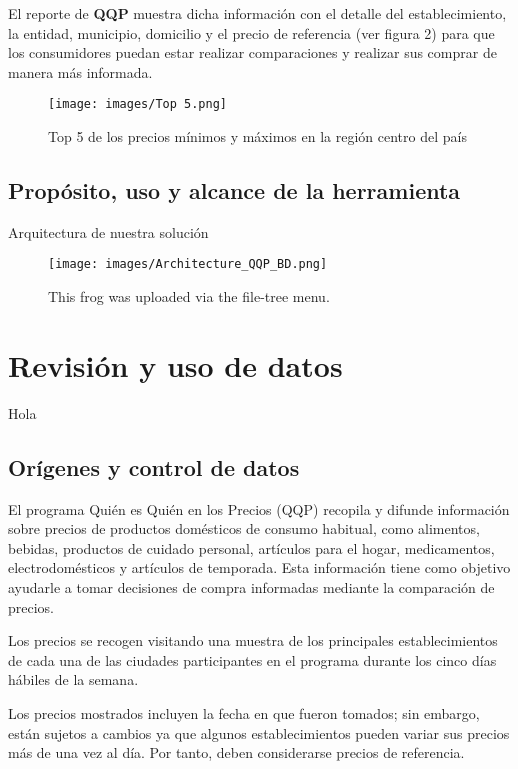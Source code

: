 \documentclass{article}
\begin{document}
\newpage 
El reporte de \textbf{QQP} muestra dicha información con el detalle del establecimiento, la entidad, municipio, domicilio y el precio de referencia (ver figura 2) para que los consumidores puedan estar realizar comparaciones y realizar sus comprar de manera más informada.

\begin{figure}[h]
\centering
\texttt{[image: images/Top 5.png]}
\caption{\label{fig:Canasta}Top 5 de los precios mínimos y máximos en la región centro del país}
\end{figure}

\subsection{Propósito, uso y alcance de la herramienta}

Arquitectura de nuestra solución
\begin{figure}[h]
\centering
\texttt{[image: images/Architecture\_QQP\_BD.png]}
\caption{\label{fig:Architecture}This frog was uploaded via the file-tree menu.}
\end{figure}

\section{Revisión y uso de datos}

Hola

\subsection{Orígenes y control de datos}

El programa Quién es Quién en los Precios (QQP) recopila y difunde información sobre precios de productos domésticos de consumo habitual, como alimentos, bebidas, productos de cuidado personal, artículos para el hogar, medicamentos, electrodomésticos y artículos de temporada. Esta información tiene como objetivo ayudarle a tomar decisiones de compra informadas mediante la comparación de precios.

Los precios se recogen visitando una muestra de los principales establecimientos de cada una de las ciudades participantes en el programa durante los cinco días hábiles de la semana.

Los precios mostrados incluyen la fecha en que fueron tomados; sin embargo, están sujetos a cambios ya que algunos establecimientos pueden variar sus precios más de una vez al día. Por tanto, deben considerarse precios de referencia.
\end{document}
